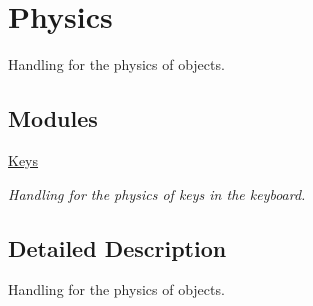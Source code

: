 \hypertarget{group___physics}{}\section{Physics}
\label{group___physics}


Handling for the physics of objects.  


\subsection*{Modules}
\begin{DoxyCompactItemize}
\item 
\hyperlink{group___keys}{Keys}
\begin{DoxyCompactList}\small\item\em Handling for the physics of keys in the keyboard. \end{DoxyCompactList}\end{DoxyCompactItemize}


\subsection{Detailed Description}
Handling for the physics of objects. 

